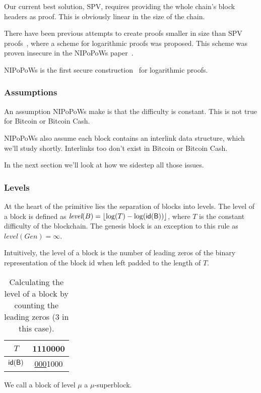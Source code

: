 \documentclass[11pt]{llncs}
\begin{document}
Our current best solution, SPV, requires providing the whole chain's block
headers as proof. This is obviously linear in the size of the chain.

There have been previous attempts to create proofs smaller in size than SPV
proofs~\cite{KLS}, where a scheme for logarithmic proofs was proposed.
This scheme was proven insecure in the NIPoPoWs paper~\cite{nipopows}.

NIPoPoWs is the first secure construction~\cite{nipopows} for logarithmic
proofs.

\subsubsection{Assumptions}
An assumption NIPoPoWs make is that the difficulty is constant. This is not
true for Bitcoin or Bitcoin Cash.

NIPoPoWs also assume each block contains an interlink data structure, which
we'll study shortly. Interlinks too don't exist in Bitcoin or Bitcoin Cash.

In the next section we'll look at how we sidestep all those issues.

\subsubsection{Levels}
At the heart of the primitive lies the separation of blocks into levels. The
level of a block is defined as $\textit{level}(B) = \left \lfloor \log(T) -
\log(\sf{id}(B)) \right \rfloor$, where $T$ is the constant difficulty of the
blockchain. The genesis block is an exception to this rule as
$\textit{level}(Gen) = \infty$.

Intuitively, the level of a block is the number of leading zeros of the binary
representation of the block id when left padded to the length of $T$.

\begin{table}
  \centering
  \begin{tabular}{|c|c|}
    \hline
    $T$ & 1110000 \\
    \hline
    $\sf{id}(B)$ & \underline{000}1000 \\
    \hline
  \end{tabular}
  \caption{Calculating the level of a block by counting the leading zeros (3 in this case).}
\end{table}

We call a block of level $\mu$ a $\mu$-superblock.
\end{document}
